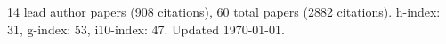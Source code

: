 14 lead author papers (908 citations),
60 total papers (2882 citations).\newline
h-index: 31, g-index: 53, i10-index: 47. Updated \today.